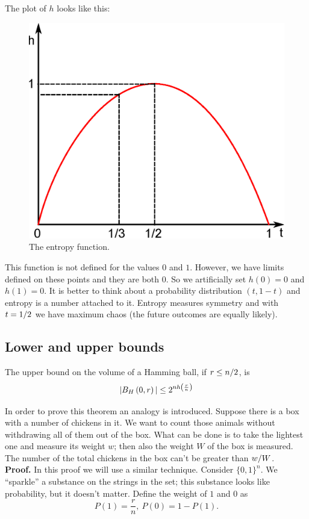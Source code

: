 The plot of $h$ looks like this:
\begin{figure}[h]
	\centering
	\includegraphics[width=0.6\linewidth]{pictures/ch01-i00.eps}
	\caption{The entropy function.}
\end{figure}

This function is not defined for the values $0$ and $1$. However, we have limits defined on these points and they are both $0$. So we artificially set $h(0) = 0$ and $h(1) = 0$. It is better to think about a probability distribution $(t, 1 - t)$ and entropy is a number attached to it. Entropy measures symmetry and with $t = {1}/{2}$ we have maximum chaos (the future outcomes are equally likely).

\subsection{Lower and upper bounds}

\begin{thm}
	The upper bound on the volume of a Hamming ball, if $ r \leq {n}/{2}$, is
	$$|B_H\left(0, r\right)| \leq 2^{nh\left(\frac{r}{n}\right)}$$
\end{thm}

In order to prove this theorem an analogy is introduced. Suppose there is a box with a number of chickens in it. We want to count those animals without withdrawing all of them out of the box. What can be done is to take the lightest one and measure its weight $w$; then also the weight $W$ of the box is measured. The number of the total chickens in the box can't be greater than ${w}/{W}$.\\

\noindent\textbf{Proof.} In this proof we will use a similar technique. Consider $\{0, 1\}^n$. We ``sparkle'' a substance on the strings in the set; this substance looks like probability, but it doesn't matter. Define the weight of $1$ and $0$ as 
$$P(1) = \dfrac{r}{n},\ P(0) = 1 - P(1).$$

